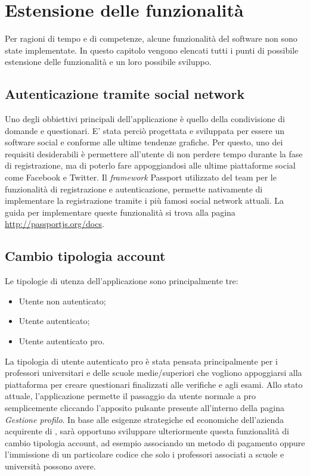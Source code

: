 \newpage
\section{Estensione delle funzionalità}
Per ragioni di tempo e di competenze, alcune funzionalità del software \progetto{} non sono state implementate. In questo capitolo vengono elencati tutti i punti di possibile estensione delle funzionalità e un loro possibile sviluppo.
\subsection{Autenticazione tramite social network}
Uno degli obbiettivi principali dell'applicazione \progetto{} è quello della condivisione di domande e questionari. E' stata perciò progettata e sviluppata per essere un software social e conforme alle ultime tendenze grafiche. Per questo, uno dei requisiti desiderabili è permettere all'utente di non perdere tempo durante la fase di registrazione, ma di poterlo fare appoggiandosi alle ultime piattaforme social come Facebook e Twitter. Il \textit{framework} Passport utilizzato del team per le funzionalità di registrazione e autenticazione, permette nativamente di implementare la registrazione tramite i più famosi social network attuali. La guida per implementare queste funzionalità si trova alla pagina \url{http://passportjs.org/docs}. 
\subsection{Cambio tipologia account}
Le tipologie di utenza dell'applicazione \progetto{} sono principalmente tre:
\begin{itemize}
	\item Utente non autenticato;
	\item Utente autenticato;
	\item Utente autenticato pro.
\end{itemize}
La tipologia di utente autenticato pro è stata pensata principalmente per i professori universitari e delle scuole medie/superiori che vogliono appoggiarsi alla piattaforma \progetto{} per creare questionari finalizzati alle verifiche e agli esami. Allo stato attuale, l'applicazione permette il passaggio da utente normale a pro semplicemente cliccando l'apposito pulsante presente all'interno della pagina \textit{Gestione profilo}. In base alle esigenze strategiche ed economiche dell'azienda acquirente di \progetto{}, sarà opportuno sviluppare ulteriormente questa funzionalità di cambio tipologia account, ad esempio associando un metodo di pagamento oppure l'immissione di un particolare codice che solo i professori associati a scuole e università possono avere.  

